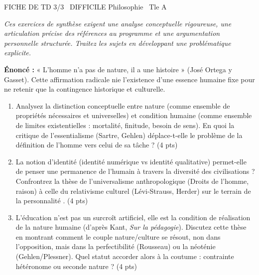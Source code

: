 \documentclass[11pt]{article}
\begin{document}
\begin{tcolorbox}[enhanced,colback=popink,colframe=popink,arc=10pt,boxrule=0pt,left=12pt,right=12pt,top=9pt,bottom=9pt]
{\color{white}\popxbold\small FICHE DE TD 3/3 \textbullet\ DIFFICILE \hfill Philosophie \textbullet\ Tle A\par}
\end{tcolorbox}
\vspace{4pt}
\noindent \textit{Ces exercices de synthèse exigent une analyse conceptuelle rigoureuse, une articulation précise des références au programme et une argumentation personnelle structurée. Traitez les sujets en développant une problématique explicite.}

\begin{exercice}
\textbf{Énoncé :} « L'homme n'a pas de nature, il a une histoire » (José Ortega y Gasset). Cette affirmation radicale nie l'existence d'une essence humaine fixe pour ne retenir que la contingence historique et culturelle.

\begin{enumerate}
    \item Analysez la distinction conceptuelle entre \og nature \fg{} (comme ensemble de propriétés nécessaires et universelles) et \og condition humaine \fg{} (comme ensemble de limites existentielles : mortalité, finitude, besoin de sens). En quoi la critique de l'essentialisme (Sartre, Gehlen) déplace-t-elle le problème de la définition de l'homme vers celui de sa \og tâche \fg{} ? (4 pts)
    \item La notion d'\og identité \fg{} (identité numérique vs identité qualitative) permet-elle de penser une permanence de l'humain à travers la diversité des civilisations ? Confrontrez la thèse de l'universalisme anthropologique (Droits de l'homme, raison) à celle du relativisme culturel (Lévi-Strauss, Herder) sur le terrain de la \og personnalité \fg{}. (4 pts)
    \item \og L'éducation n'est pas un surcroît artificiel, elle est la condition de réalisation de la nature humaine \fg{} (d'après Kant, \textit{Sur la pédagogie}). Discutez cette thèse en montrant comment le couple nature/culture se résout, non dans l'opposition, mais dans la \og perfectibilité \fg{} (Rousseau) ou la \og néoténie \fg{} (Gehlen/Plessner). Quel statut accorder alors à la \og coutume \fg{} : contrainte hétéronome ou seconde nature ? (4 pts)
\end{enumerate}
\end{exercice}
\end{document}
